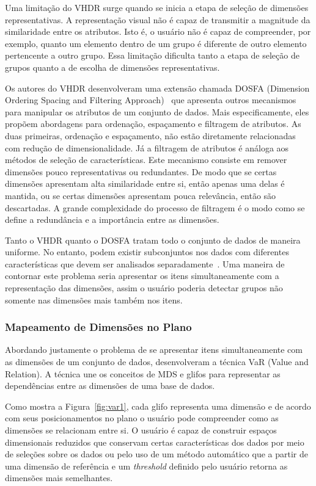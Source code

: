 Uma limitação do VHDR surge quando se inicia a etapa de seleção de dimensões representativas. A representação visual não é capaz de transmitir a magnitude da similaridade entre os atributos. Isto é, o usuário não é capaz de compreender, por exemplo, quanto um elemento dentro de um grupo é diferente de outro elemento pertencente a outro grupo. Essa limitação dificulta tanto a etapa de seleção de grupos quanto a de escolha de dimensões representativas.

Os autores do VHDR desenvolveram uma extensão chamada DOSFA (Dimension Ordering Spacing and Filtering Approach)~\cite{DOSFA} que apresenta outros mecanismos para manipular os atributos de um conjunto de dados. Mais especificamente, eles propõem abordagens para ordenação, espaçamento e filtragem de atributos. As duas primeiras, ordenação e espaçamento, não estão diretamente relacionadas com redução de dimensionalidade. Já a filtragem de atributos é análoga aos métodos de seleção de características. Este mecanismo consiste em remover dimensões pouco representativas ou redundantes. De modo que se certas dimensões apresentam alta similaridade entre si, então apenas uma delas é mantida, ou se certas dimensões apresentam pouca relevância, então são descartadas. A grande complexidade do processo de filtragem é o modo como se define a redundância e a importância entre as dimensões. 

Tanto o VHDR quanto o DOSFA tratam todo o conjunto de dados de maneira uniforme. No entanto, podem existir subconjuntos nos dados com diferentes características que devem ser analisados separadamente~\cite{May2011}. Uma maneira de contornar este problema seria apresentar os itens simultaneamente com a representação das dimensões, assim o usuário poderia detectar grupos não somente nas dimensões mais também nos itens.

\subsubsection{Mapeamento de Dimensões no Plano}

Abordando justamente o problema de se apresentar itens simultaneamente com as dimensões de um conjunto de dados, \cite{Yang2004} desenvolveram a técnica VaR (Value and Relation). A técnica une os conceitos de MDS e glifos para representar as dependências entre as dimensões de uma base de dados. 

Como mostra a Figura~\ref{fig:var1}, cada glifo representa uma dimensão e de acordo com seus posicionamentos no plano o usuário pode compreender como as dimensões se relacionam entre si. 
O usuário é capaz de construir espaços dimensionais reduzidos que conservam certas características dos dados por meio de seleções sobre os dados ou pelo uso de um método automático que a partir de uma dimensão de referência e um \emph{threshold} definido pelo usuário retorna as dimensões mais semelhantes.

